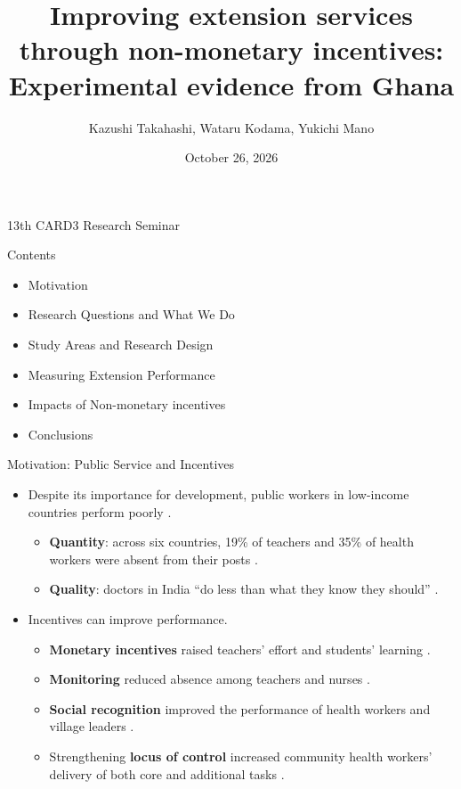 \documentclass[aspectratio=169]{beamer}
\title[Improving extension services]{Improving extension services through non-monetary incentives: Experimental evidence from Ghana}
\author[Takahashi et al.]{Kazushi Takahashi, Wataru Kodama, Yukichi Mano}
\date{October 26, 2026}
\begin{document}
\begin{frame}{}
		\titlepage
        \centering
        13th CARD3 Research Seminar
	\end{frame}

\begin{frame}{Contents} %
		\begin{itemize}
			\item Motivation %
			\item Research Questions and What We Do
			\item Study Areas and Research Design
			\item Measuring Extension Performance
			\item Impacts of Non-monetary incentives
            \item Conclusions
		\end{itemize}
	\end{frame}

\begin{frame}{Motivation: Public Service and Incentives}
	\begin{itemize}
		\item Despite its importance for development, public workers in low-income
		countries perform poorly \citep{duflo_incentives_2012, finan_chapter_2017}.
		\begin{itemize}
			\item \textbf{Quantity}: across six countries, 19\% of teachers and 35\% of health
			workers were absent from their posts \citep{chaudhury_missing_2006}.
			\item \textbf{Quality}: doctors in India ``do less than what they know they should''
			\citep{das_money_2007}.
		\end{itemize}
		\item Incentives can improve performance.
		\begin{itemize}
			\item \textbf{Monetary incentives} raised teachers' effort and students' learning
			\citep{leaver_recruitment_2021, muralidharan_teacher_2011}.
			\item \textbf{Monitoring} reduced absence among teachers \citep{duflo_incentives_2012}
			and nurses \citep{banerjee_putting_2008}.
			\item \textbf{Social recognition} improved the performance of health workers
			\citep{ashraf_awards_2014} and village leaders \citep{mansuri_money_2023}.
			\item Strengthening \textbf{locus of control} increased community health workers'
			delivery of both core and additional tasks \citep{khan_mission_2025}.
		\end{itemize}
	\end{itemize}
\end{frame}
\end{document}
